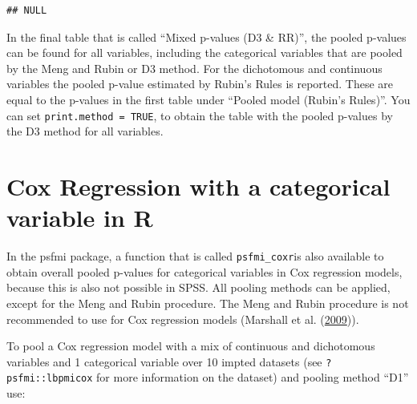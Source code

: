 \documentclass[
]{book}
\newenvironment{Shaded}{\begin{snugshade}}{\end{snugshade}}
\newcommand{\NormalTok}[1]{#1}
\newcommand{\OperatorTok}[1]{\textcolor[rgb]{0.81,0.36,0.00}{\textbf{#1}}}
\begin{document}
\begin{Shaded}
\end{Shaded}

\begin{verbatim}
## NULL
\end{verbatim}

In the final table that is called ``Mixed p-values (D3 \& RR)'', the
pooled p-values can be found for all variables, including the
categorical variables that are pooled by the Meng and Rubin or D3
method. For the dichotomous and continuous variables the pooled p-value
estimated by Rubin's Rules is reported. These are equal to the p-values
in the first table under ``Pooled model (Rubin's Rules)''. You can set
\texttt{print.method\ =\ TRUE}, to obtain the table with the pooled
p-values by the D3 method for all variables.

\hypertarget{cox-regression-with-a-categorical-variable-in-r}{%
\section{Cox Regression with a categorical variable in
R}\label{cox-regression-with-a-categorical-variable-in-r}}

In the psfmi package, a function that is called \texttt{psfmi\_coxr}is
also available to obtain overall pooled p-values for categorical
variables in Cox regression models, because this is also not possible in
SPSS. All pooling methods can be applied, except for the Meng and Rubin
procedure. The Meng and Rubin procedure is not recommended to use for
Cox regression models (Marshall et al.
(\protect\hyperlink{ref-Marshall2009MedResMeth}{2009})).

To pool a Cox regression model with a mix of continuous and dichotomous
variables and 1 categorical variable over 10 impted datasets (see
\texttt{?psfmi::lbpmicox} for more information on the dataset) and
pooling method ``D1'' use:
\end{document}
